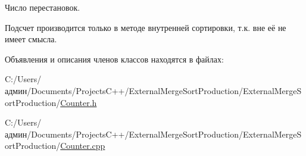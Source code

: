 Число перестановок. 

Подсчет производится только в методе внутренней сортировки, т.\+к. вне её не имеет смысла. 

Объявления и описания членов классов находятся в файлах\+:\begin{DoxyCompactItemize}
\item 
C\+:/\+Users/админ/\+Documents/\+Projects\+C++/\+External\+Merge\+Sort\+Production/\+External\+Merge\+Sort\+Production/\hyperlink{_counter_8h}{Counter.\+h}\item 
C\+:/\+Users/админ/\+Documents/\+Projects\+C++/\+External\+Merge\+Sort\+Production/\+External\+Merge\+Sort\+Production/\hyperlink{_counter_8cpp}{Counter.\+cpp}\end{DoxyCompactItemize}
